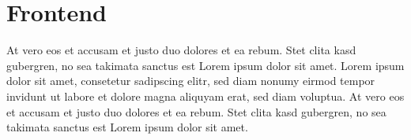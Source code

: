 \section{Frontend}
At vero eos et accusam et justo duo dolores et ea rebum. Stet clita kasd gubergren,
no sea takimata sanctus est Lorem ipsum dolor sit amet. Lorem ipsum dolor sit amet,
consetetur sadipscing elitr, sed diam nonumy eirmod tempor invidunt ut labore et
dolore magna aliquyam erat, sed diam voluptua.
At vero eos et accusam et justo duo dolores et ea rebum.
Stet clita kasd gubergren, no sea takimata sanctus est Lorem ipsum dolor sit amet.
